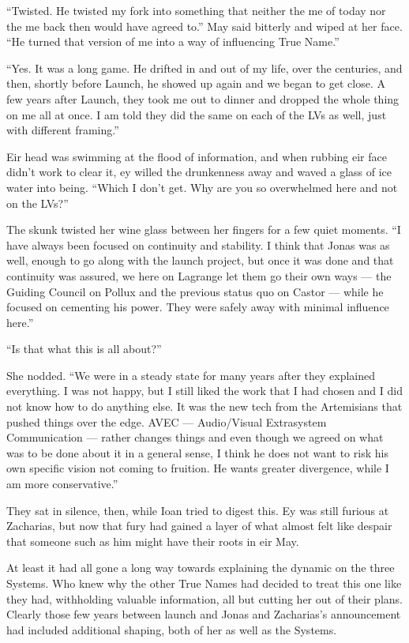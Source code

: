 ``Twisted. He twisted my fork into something that neither the me of today nor the me back then would have agreed to.'' May said bitterly and wiped at her face. ``He turned that version of me into a way of influencing True Name.''

``Yes. It was a long game. He drifted in and out of my life, over the centuries, and then, shortly before Launch, he showed up again and we began to get close. A few years after Launch, they took me out to dinner and dropped the whole thing on me all at once. I am told they did the same on each of the LVs as well, just with different framing.''

Eir head was swimming at the flood of information, and when rubbing eir face didn't work to clear it, ey willed the drunkenness away and waved a glass of ice water into being. ``Which I don't get. Why are you so overwhelmed here and not on the LVs?''

The skunk twisted her wine glass between her fingers for a few quiet moments. ``I have always been focused on continuity and stability. I think that Jonas was as well, enough to go along with the launch project, but once it was done and that continuity was assured, we here on Lagrange let them go their own ways — the Guiding Council on Pollux and the previous status quo on Castor — while he focused on cementing his power. They were safely away with minimal influence here.''

``Is that what this is all about?''

She nodded. ``We were in a steady state for many years after they explained everything. I was not happy, but I still liked the work that I had chosen and I did not know how to do anything else. It was the new tech from the Artemisians that pushed things over the edge. AVEC — Audio/Visual Extrasystem Communication — rather changes things and even though we agreed on what was to be done about it in a general sense, I think he does not want to risk his own specific vision not coming to fruition. He wants greater divergence, while I am more conservative.''

They sat in silence, then, while Ioan tried to digest this. Ey was still furious at Zacharias, but now that fury had gained a layer of what almost felt like despair that someone such as him might have their roots in eir May.

At least it had all gone a long way towards explaining the dynamic on the three Systems. Who knew why the other True Names had decided to treat this one like they had, withholding valuable information, all but cutting her out of their plans. Clearly those few years between launch and Jonas and Zacharias's announcement had included additional shaping, both of her as well as the Systems.

